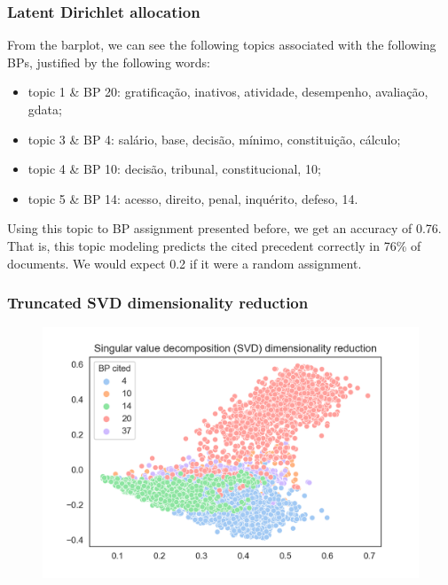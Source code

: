\documentclass{beamer}
\begin{document}
    \begin{frame}
        \frametitle{Latent Dirichlet allocation}
        From the barplot, we can see the following topics associated with the following BPs, justified by the following words:
        \begin{itemize}
            \item topic 1 \& BP 20: gratificação, inativos, atividade, desempenho, avaliação, gdata;
            \item topic 3 \& BP 4: salário, base, decisão, mínimo, constituição, cálculo;
            \item topic 4 \& BP 10: decisão, tribunal, constitucional, 10;
            \item topic 5 \& BP 14: acesso, direito, penal, inquérito, defeso, 14.
        \end{itemize}
        \pause
        Using this topic to BP assignment presented before, we get an accuracy of 0.76. That is, this topic modeling predicts the cited precedent correctly in 76\% of documents. We would expect 0.2 if it were a random assignment.
    \end{frame}

    \begin{frame}
        \frametitle{Truncated SVD dimensionality reduction}
        \begin{figure}
            \centering
            \includegraphics[width=0.8\linewidth]{svd_1.png}
        \end{figure}
    \end{frame}
\end{document}
